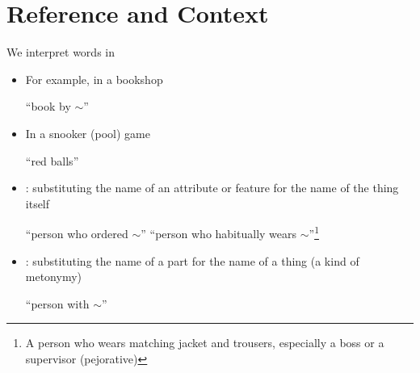 \documentclass{beamer}
\begin{document}
\section{Reference and Context}
\MyLogo{}



\begin{frame}{We interpret words in }

\begin{itemize}\addtolength{\itemsep}{-.5ex}
\item For example, in a bookshop
  \begin{exe}
    \ex {} \textnormal{``book by $\sim$''}
  \end{exe}
\item In a snooker (pool)  game
  \begin{exe}
    \ex {} ``red balls''
  \end{exe}
\item {}: substituting the name of an attribute or feature for the name of the thing itself
  \begin{exe}
    \ex {} ``person who ordered $\sim$''
    \ex {} ``person who
    habitually wears $\sim$''\footnote{ A person who wears matching
      jacket and trousers, especially a boss or a supervisor (pejorative)}
  \end{exe}
  \item {}: substituting the name of a part for the name of a thing
    (a kind of metonymy)
  \begin{exe}
    \ex {} ``person with $\sim$''
  \end{exe}


\end{itemize}


\end{frame}
\end{document}
